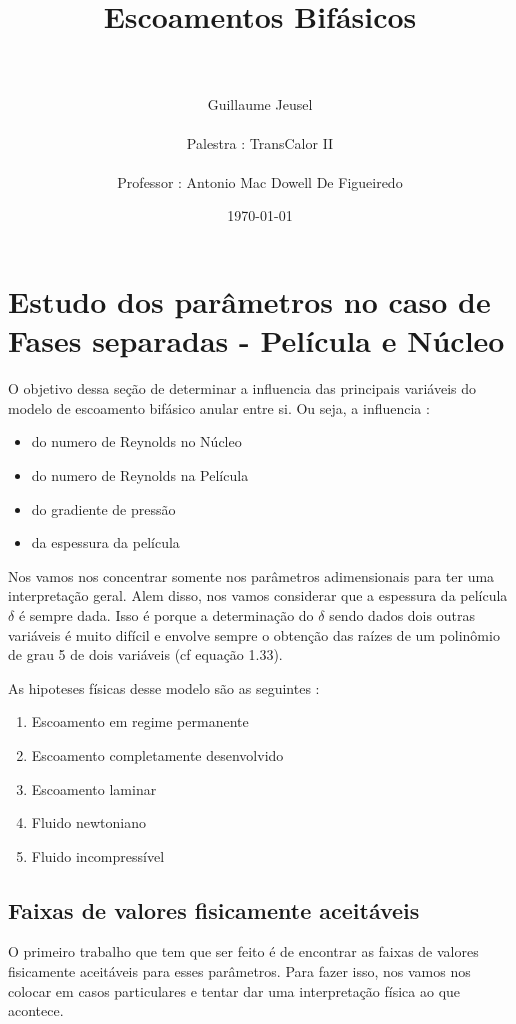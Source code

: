 \documentclass[a4paper, 11pt]{article}
\title{
\normalfont \normalsize
\horrule{0.5pt} \\[0.4cm] %
\huge \textbf{Escoamentos Bifásicos}\\ %
\horrule{2pt} \\[0.5cm] %
}
\author{Guillaume Jeusel \\ \\
Palestra : TransCalor II \\ \\
Professor : Antonio Mac Dowell De Figueiredo}
\date{\normalsize\today} %
\begin{document}
\maketitle %
\newpage

\section{Estudo dos parâmetros no caso de Fases separadas - Película e Núcleo}
O objetivo dessa seção de determinar a influencia das principais variáveis do modelo de escoamento bifásico anular entre si.
Ou seja, a influencia :
\begin{itemize}
  \item do numero de Reynolds no Núcleo
  \item do numero de Reynolds na Película
  \item do gradiente de pressão
  \item da espessura da película
\end{itemize}
Nos vamos nos concentrar somente nos parâmetros adimensionais para ter uma interpretação geral.
Alem disso, nos vamos considerar que a espessura da película $\delta$ é sempre dada. Isso é porque a determinação do $\delta$ sendo dados dois outras variáveis é muito difícil e envolve sempre o obtenção das raízes de um polinômio de grau 5 de dois variáveis (cf equação 1.33).

As hipoteses físicas desse modelo são as seguintes :
\begin{enumerate}
  \item Escoamento em regime permanente
  \item Escoamento completamente desenvolvido
  \item Escoamento laminar
  \item Fluido newtoniano
  \item Fluido incompressível
\end{enumerate}

\subsection{Faixas de valores fisicamente aceitáveis}
O primeiro trabalho que tem que ser feito é de encontrar as faixas de valores fisicamente aceitáveis para esses parâmetros.
Para fazer isso, nos vamos nos colocar em casos particulares e tentar dar uma interpretação física ao que acontece.
\end{document}
